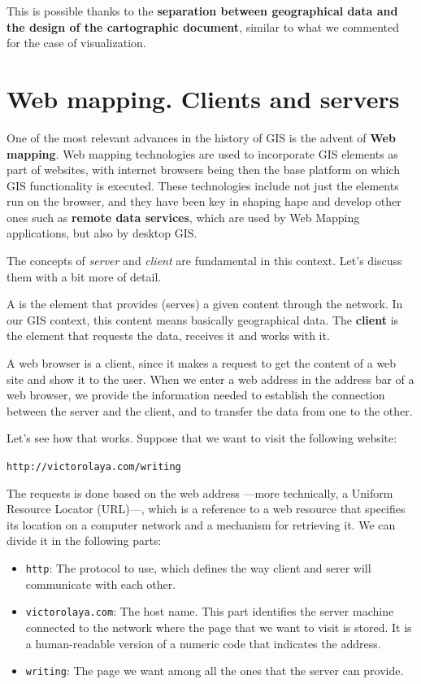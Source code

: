 This is possible thanks to the \textbf{separation between geographical data and the design of the cartographic document}, similar to what we commented for the case of visualization.


\section{Web mapping. Clients and servers}

One of the most relevant advances in the history of GIS is the advent of \textbf{Web mapping}. Web mapping technologies are used to incorporate GIS elements as part of websites, with internet browsers being then the base platform on which GIS functionality is executed. These technologies include not just the elements run on the browser, and they have been key in shaping hape and develop other ones such as \textbf{remote data services}, which are used by Web Mapping applications, but also by desktop GIS.

The concepts of \emph{server} and \emph{client} are fundamental in this context. Let's discuss them with a bit more of detail.

A \textbf{} is the element that provides (serves) a given content through the network. In our GIS context, this content means basically geographical data. The \textbf{client} is the element that requests the data, receives it and works with it. 

A web browser is a client, since it makes a request to get the content of a web site and show it to the user. When we enter a web address in the address bar of a web browser, we provide the information needed to establish the connection between the server and the client, and to transfer the data from one to the other.

Let's see how that works. Suppose that we want to visit the following website:

\begin{center}
\small\texttt{http://victorolaya.com/writing}
\end{center}

The requests is done based on the web address ---more technically, a Uniform Resource Locator (URL)---, which is a reference to a web resource that specifies its location on a computer network and a mechanism for retrieving it. We can divide it in the following parts:

\begin{itemize}
	\item \texttt{http}: The protocol to use, which defines the way client and serer will communicate with each other.
	\item \texttt{victorolaya.com}: The host name. This part identifies the server machine connected to the network where the page that we want to visit is stored. It is a human-readable version of a numeric code that indicates the address.
	\item \texttt{writing}: The page we want among all the ones that the server can provide. 
\end{itemize}

